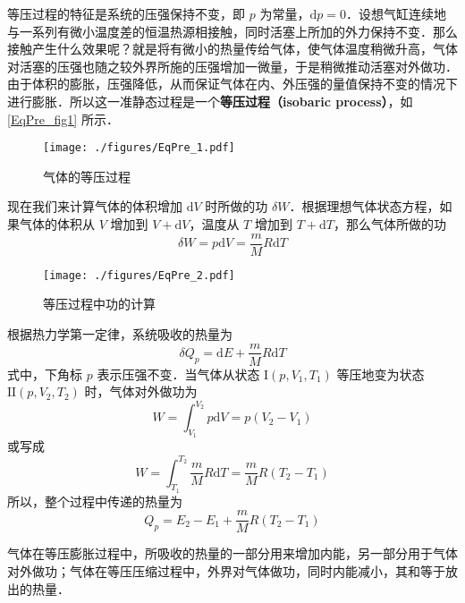 

等压过程的特征是系统的压强保持不变，即 $p $ 为常量，$\mathrm dp =0$．设想气缸连续地与一系列有微小温度差的恒温热源相接触，同时活塞上所加的外力保持不变．那么接触产生什么效果呢？就是将有微小的热量传给气体，使气体温度稍微升高，气体对活塞的压强也随之较外界所施的压强增加一微量，于是稍微推动活塞对外做功．由于体积的膨胀，压强降低，从而保证气体在内、外压强的量值保持不变的情况下进行膨胀．所以这一准静态过程是一个\textbf{等压过程（isobaric process）}，如\autoref{EqPre_fig1} 所示．
\begin{figure}[ht]
\centering
\texttt{[image: ./figures/EqPre\_1.pdf]}
\caption{气体的等压过程} \label{EqPre_fig1}
\end{figure}
现在我们来计算气体的体积增加 $\mathrm d V $ 时所做的功 $\delta W$．根据理想气体状态方程，如果气体的体积从 $V $ 增加到 $V+\mathrm dV$，温度从 $T $ 增加到 $T+\mathrm dT$，那么气体所做的功
\begin{equation}
\delta W=p \mathrm{d} V=\frac{m}{M} R \mathrm{d} T
\end{equation}
\begin{figure}[ht]
\centering
\texttt{[image: ./figures/EqPre\_2.pdf]}
\caption{等压过程中功的计算} \label{EqPre_fig2}
\end{figure}
根据热力学第一定律，系统吸收的热量为
\begin{equation}
\delta Q_{p}=\mathrm{d} E+\frac{m}{M} R \mathrm{d} T
\end{equation}
式中，下角标 $p $ 表示压强不变．当气体从状态 $\mathrm I(p, V_1, T_1)$ 等压地变为状态 $\mathrm{II}(p, V_2,T_2)$ 时，气体对外做功为
\begin{equation}
W=\int_{V_{1}}^{V_{2}} p \mathrm{d} V=p\left(V_{2}-V_{1}\right)
\end{equation}
或写成
\begin{equation}
W=\int_{T_{1}}^{T_{2}} \frac{m}{M} R \mathrm{d} T=\frac{m}{M} R\left(T_{2}-T_{1}\right)
\end{equation}
所以，整个过程中传递的热量为
\begin{equation}
Q_{p}=E_{2}-E_{1}+\frac{m}{M} R\left(T_{2}-T_{1}\right)
\end{equation}

气体在等压膨胀过程中，所吸收的热量的一部分用来增加内能，另一部分用于气体对外做功；气体在等压压缩过程中，外界对气体做功，同时内能减小，其和等于放出的热量．

